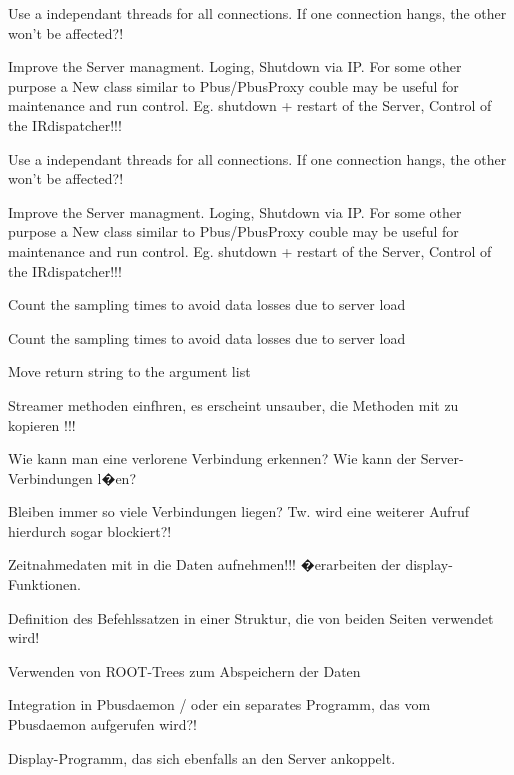 
\begin{DoxyRefList}
\item[\label{todo__todo000001}%
\hypertarget{todo__todo000001}{}%
Class \hyperlink{classBaseServer}{Base\-Server} ]Use a independant threads for all connections. If one connection hangs, the other won't be affected?! 

Improve the Server managment. Loging, Shutdown via I\-P. For some other purpose a New class similar to Pbus/\-Pbus\-Proxy couble may be useful for maintenance and run control. Eg. shutdown + restart of the Server, Control of the I\-Rdispatcher!!!

Use a independant threads for all connections. If one connection hangs, the other won't be affected?! 

Improve the Server managment. Loging, Shutdown via I\-P. For some other purpose a New class similar to Pbus/\-Pbus\-Proxy couble may be useful for maintenance and run control. Eg. shutdown + restart of the Server, Control of the I\-Rdispatcher!!! 
\item[\label{todo__todo000002}%
\hypertarget{todo__todo000002}{}%
Member \hyperlink{classBaseServer_aab359a913d5494d783178c7887f0e3ef}{Base\-Server\-:\-:init\-\_\-server} (int fd1=-\/1, int fd2=-\/1)]Count the sampling times to avoid data losses due to server load 

Count the sampling times to avoid data losses due to server load  
\item[\label{todo__todo000015}%
\hypertarget{todo__todo000015}{}%
Class \hyperlink{classCeilometer}{Ceilometer} ]Move return string to the argument list 
\item[\label{todo__todo000013}%
\hypertarget{todo__todo000013}{}%
Class \hyperlink{classDataServer}{Data\-Server} ]Streamer methoden einfhren, es erscheint unsauber, die Methoden mit zu kopieren !!! 

Wie kann man eine verlorene Verbindung erkennen? Wie kann der Server-\/\-Verbindungen l�en?
\begin{DoxyItemize}
\item Bleiben immer so viele Verbindungen liegen? Tw. wird eine weiterer Aufruf hierdurch sogar blockiert?!
\item Zeitnahmedaten mit in die Daten aufnehmen!!! �erarbeiten der display-\/\-Funktionen.
\item Definition des Befehlssatzen in einer Struktur, die von beiden Seiten verwendet wird!
\item Verwenden von R\-O\-O\-T-\/\-Trees zum Abspeichern der Daten
\item Integration in Pbusdaemon / oder ein separates Programm, das vom Pbusdaemon aufgerufen wird?!
\item Display-\/\-Programm, das sich ebenfalls an den Server ankoppelt.
\end{DoxyItemize}


\end{DoxyRefList}
